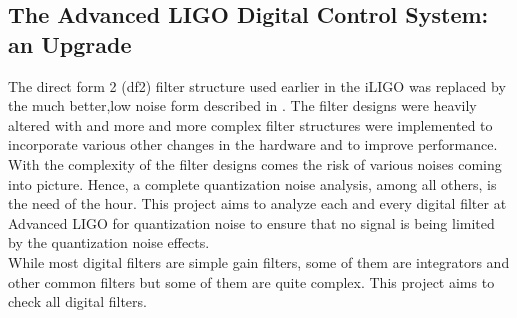 \documentclass[colorlinks=true,pdfstartview=FitV,linkcolor=blue,
            citecolor=red,urlcolor=magenta]{ligodoc}
\begin{document}
	\subsection{The Advanced LIGO Digital Control System: an Upgrade} The direct form 2 (df2) filter structure used earlier in the iLIGO was replaced by the much better,low noise form described in \cite{matts}. The filter designs were heavily altered with and more and more complex filter structures were implemented to incorporate various other changes in the hardware and to improve performance. With the complexity of the filter designs comes the risk of various noises coming into picture. Hence, a complete quantization noise analysis, among all others, is the need of the hour. This project aims to analyze each and every digital filter at Advanced LIGO for quantization noise to ensure that no signal is being limited by the quantization noise effects.\\While most digital filters are simple gain filters, some of them are integrators and other common filters but some of them are quite complex. This project aims to check all digital filters.
\end{document}
